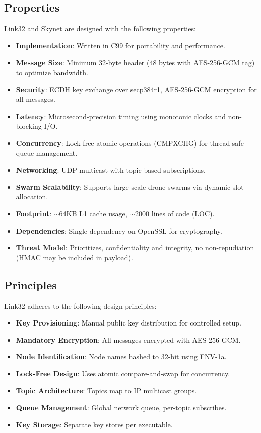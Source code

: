 \documentclass{article}
\begin{document}
\subsection{Properties}
Link32 and Skynet are designed with the following properties:
\begin{itemize}
    \item \textbf{Implementation}: Written in C99 for portability and performance.
    \item \textbf{Message Size}: Minimum 32-byte header (48 bytes with AES-256-GCM tag) to optimize bandwidth.
    \item \textbf{Security}: ECDH key exchange over secp384r1, AES-256-GCM encryption for all messages.
    \item \textbf{Latency}: Microsecond-precision timing using monotonic clocks and non-blocking I/O.
    \item \textbf{Concurrency}: Lock-free atomic operations (CMPXCHG) for thread-safe queue management.
    \item \textbf{Networking}: UDP multicast with topic-based subscriptions.
    \item \textbf{Swarm Scalability}: Supports large-scale drone swarms via dynamic slot allocation.
    \item \textbf{Footprint}: $\sim$64KB L1 cache usage, $\sim$2000 lines of code (LOC).
    \item \textbf{Dependencies}: Single dependency on OpenSSL for cryptography.
    \item \textbf{Threat Model}: Prioritizes, confidentiality and integrity, no non-repudiation (HMAC may be included in payload).
\end{itemize}

\newpage
\subsection{Principles}
Link32 adheres to the following design principles:
\begin{itemize}
    \item \textbf{Key Provisioning}: Manual public key distribution for controlled setup.
    \item \textbf{Mandatory Encryption}: All messages encrypted with AES-256-GCM.
    \item \textbf{Node Identification}: Node names hashed to 32-bit using FNV-1a.
    \item \textbf{Lock-Free Design}: Uses atomic compare-and-swap for concurrency.
    \item \textbf{Topic Architecture}: Topics map to IP multicast groups.
    \item \textbf{Queue Management}: Global network queue, per-topic subscribes.
    \item \textbf{Key Storage}: Separate key stores per executable.
\end{itemize}
\end{document}

